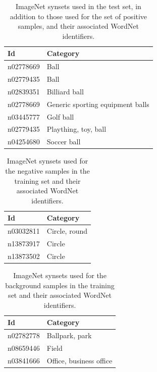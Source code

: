 \documentclass{llncs}
\begin{document}
{{			\begin{table}
				\centering
				\caption{ImageNet synsets used in the test set, in addition to those used for the set of positive samples, and their associated WordNet identifiers.}
				\label{tab:test_set}
				\begin{tabularx}{\textwidth}{@{}lX@{}}
					\toprule
					\textbf{Id} & \textbf{Category} \\
					\midrule
						n02778669 & Ball \\
						n02779435 & Ball \\
						n02839351 & Billiard ball \\
						n02778669 & Generic sporting equipment balls \\
						n03445777 & Golf ball \\
						n02779435 & Plaything, toy, ball \\
						n04254680 & Soccer ball \\
					\bottomrule
				\end{tabularx}
			\end{table}

			\begin{table}
				\centering
				\caption{ImageNet synsets used for the negative samples in the training set and their associated WordNet identifiers.}
				\label{tab:negative_samples}
				\begin{tabularx}{\textwidth}{@{}lX@{}}
					\toprule
					\textbf{Id} & \textbf{Category} \\
					\midrule
						n03032811 & Circle, round \\
						n13873917 & Circle \\
						n13873502 & Circle \\
					\bottomrule
				\end{tabularx}
			\end{table}

			\begin{table}
				\centering
				\caption{ImageNet synsets used for the background samples in the training set and their associated WordNet identifiers.}
				\label{tab:background_samples}
				\begin{tabularx}{\textwidth}{@{}lX@{}}
					\toprule
					\textbf{Id} & \textbf{Category} \\
					\midrule
						n02782778 & Ballpark, park \\
						n08659446 & Field \\
						n03841666 & Office, business office \\
					\bottomrule
				\end{tabularx}
			\end{table}

		}
	}
\end{document}
